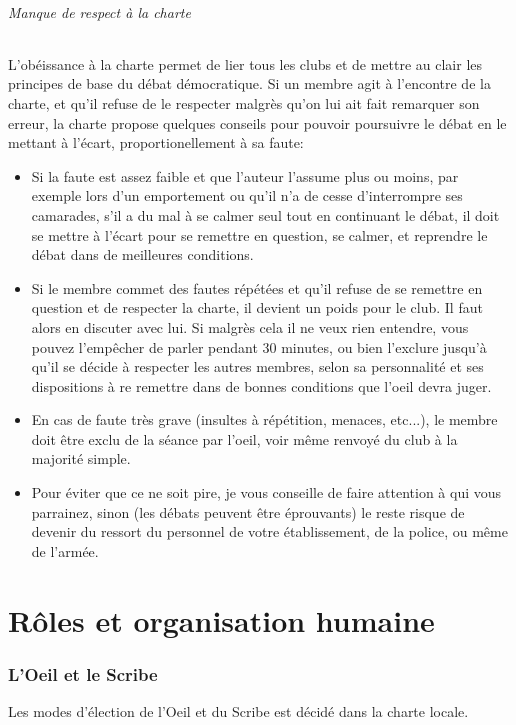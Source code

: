 \documentclass[a4paper,12pt]{article}
\begin{document}
\paragraph{Manque de respect à la charte}
L'obéissance à la charte permet de lier tous les clubs et de mettre au clair les principes de base du débat démocratique. Si un membre agit à l'encontre de la charte, et qu'il refuse de le respecter malgrès qu'on lui ait fait remarquer son erreur, la charte propose quelques conseils pour pouvoir poursuivre le débat en le mettant à l'écart, proportionellement à sa faute:
\begin{itemize}
  \item Si la faute est assez faible et que l'auteur l'assume plus ou moins, par exemple lors d'un emportement ou qu'il n'a de cesse d'interrompre ses camarades, s'il a du mal à se calmer seul tout en continuant le débat, il doit se mettre à l'écart pour se remettre en question, se calmer, et reprendre le débat dans de meilleures conditions.
  \item Si le membre commet des fautes répétées et qu'il refuse de se remettre en question et de respecter la charte, il devient un poids pour le club. Il faut alors en discuter avec lui. Si malgrès cela il ne veux rien entendre, vous pouvez l'empêcher de parler pendant 30 minutes, ou bien l'exclure jusqu'à qu'il se décide à respecter les autres membres, selon sa personnalité et ses dispositions à re remettre dans de bonnes conditions que l'oeil devra juger.
  \item En cas de faute très grave (insultes à répétition, menaces, etc...), le membre doit être exclu de la séance par l'oeil, voir même renvoyé du club à la majorité simple.
  \item Pour éviter que ce ne soit pire, je vous conseille de faire attention à qui vous parrainez, sinon (les débats peuvent être éprouvants) le reste risque de devenir du ressort du personnel de votre établissement, de la police, ou même de l'armée.
\end{itemize}


\newpage
\part{Rôles et organisation humaine}
\section{L'Oeil et le Scribe}
Les modes d'élection de l'Oeil et du Scribe est décidé dans la charte locale.
\end{document}
